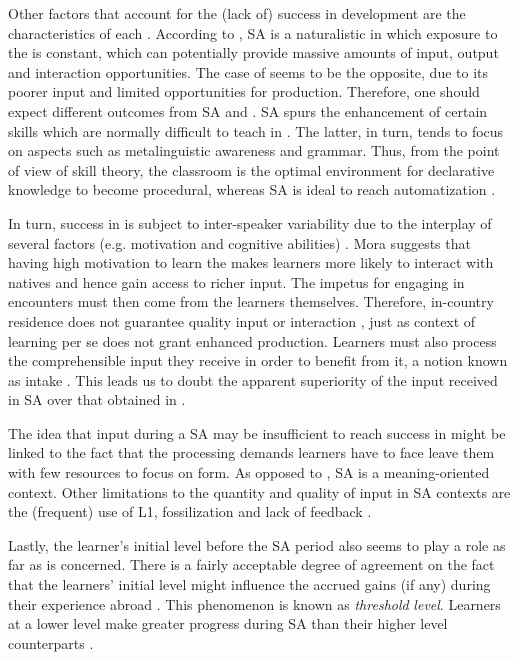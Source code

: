 \documentclass[output=paper]{langsci/langscibook}
\begin{document}
  Other factors that account for the (lack of) success in   development are the characteristics of each . According to \citet{Pérez-Vidal2014}, SA is a naturalistic  in which exposure to the  is constant, which can potentially provide massive amounts of input, output and interaction opportunities. The case of  seems to be the opposite, due to its poorer input and limited opportunities for production. Therefore, one should expect different  outcomes from SA and . SA spurs the enhancement of certain skills which are normally difficult to teach in . The latter, in turn, tends to focus on aspects such as metalinguistic awareness and grammar. Thus, from the point of view of skill  theory, the classroom is the optimal environment for declarative knowledge to become procedural, whereas SA is ideal to reach automatization \citep[214]{DeKeyser2007study}. 



  In turn, success in   is subject to inter-speaker variability due to the interplay of several factors (e.g. motivation and cognitive abilities) \citep{Mora2014}. Mora suggests that having high motivation to learn the  makes learners more likely to interact with natives and hence gain access to richer input. The impetus for engaging in  encounters must then come from the learners themselves. Therefore, in-country residence does not guarantee quality input or interaction \citep{Moyer2009}, just as context of learning per se does not grant enhanced  production. Learners must also process the comprehensible input they receive in order to benefit from it, a notion known as intake \citep{Archibald2005}. This leads us to doubt the apparent superiority of the input received in SA over that obtained in . 



  The idea that input during a SA may be insufficient to reach success in    might be linked to the fact that the processing demands learners have to face leave them with few resources to focus on form. As opposed to , SA is a meaning-oriented context. Other limitations to the quantity and quality of input in SA contexts are the (frequent) use of L1, fossilization and lack of feedback \citep{Han2004}.



  Lastly, the learner’s initial  level before the SA period also seems to play a role as far as   is concerned. There is a fairly acceptable degree of agreement on the fact that the learners’ initial  level might influence the accrued gains (if any) during their experience abroad \citep{Collentine2009}. This phenomenon is known as \textit{threshold} \textit{level}. Learners at a lower level make greater progress during SA than their higher level counterparts \citep{BrechtEtAl1995}. 
\end{document}
